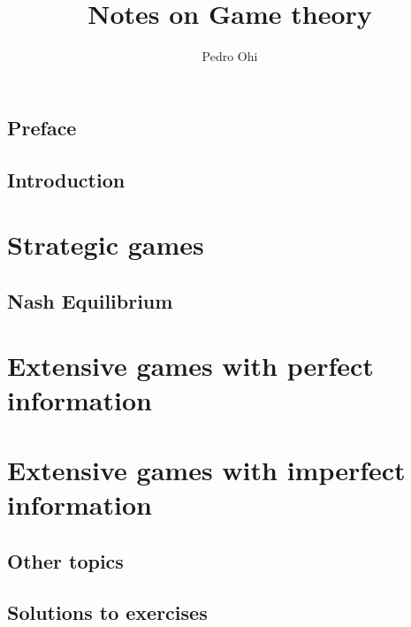 \documentclass[a4paper, 12pt, openany]{book}
\title{Notes on Game theory}
\author{Pedro Ohi}
\numberwithin{equation}{section}
\theoremstyle{plain}
\theoremstyle{definition}
\theoremstyle{remark}
\begin{document}
\maketitle
\tableofcontents
\chapter*{Preface}


\chapter{Introduction}




\part{Strategic games}
\chapter{Nash Equilibrium}




\part{Extensive games with perfect information}

\part{Extensive games with imperfect information}

\begin{appendices}
\chapter{Other topics}

\chapter{Solutions to exercises}

\end{appendices}

\printbibliography
\end{document}
